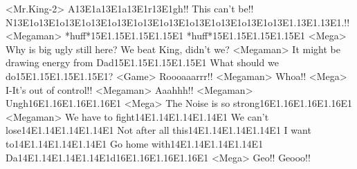 <Mr.King-2> A{13}{E1}a{13}{E1}a{13}{E1}r{13}{E1}gh!! 
This can't be!! 
N{13}{E1}o{13}{E1}o{13}{E1}o{13}{E1}o{13}{E1}o{13}{E1}o{13}{E1}o{13}{E1}o{13}{E1}o{13}{E1}o{13}{E1}.{13}{E1}.{13}{E1}.!! 
<Megaman> *huff*{15}{E1}.{15}{E1}.{15}{E1}.{15}{E1} *huff*{15}{E1}.{15}{E1}.{15}{E1}.{15}{E1} 
<Mega> Why is big ugly still here? We beat King, didn't we? 
<Megaman> It might be drawing energy from Dad{15}{E1}.{15}{E1}.{15}{E1}.{15}{E1} 
What should we do{15}{E1}.{15}{E1}.{15}{E1}.{15}{E1}? 
<Game> Roooaaarrr!! 
<Megaman> Whoa!! 
<Mega> I-It's out of control!! 
<Megaman> Aaahhh!! 
<Megaman> Ungh{16}{E1}.{16}{E1}.{16}{E1}.{16}{E1} 
<Mega> The Noise is so strong{16}{E1}.{16}{E1}.{16}{E1}.{16}{E1} 
<Megaman> We have to fight{14}{E1}.{14}{E1}.{14}{E1}.{14}{E1} 
We can't lose{14}{E1}.{14}{E1}.{14}{E1}.{14}{E1} Not after all this{14}{E1}.{14}{E1}.{14}{E1}.{14}{E1} 
I want to{14}{E1}.{14}{E1}.{14}{E1}.{14}{E1} 
Go home with{14}{E1}.{14}{E1}.{14}{E1}.{14}{E1} Da{14}{E1}.{14}{E1}.{14}{E1}.{14}{E1}d{16}{E1}.{16}{E1}.{16}{E1}.{16}{E1} 
<Mega> Geo!! 
Geooo!! 
